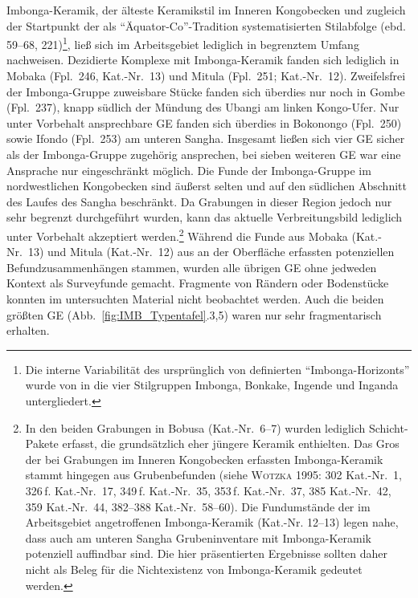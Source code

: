 Imbonga-Keramik, der älteste Keramikstil im Inneren Kongobecken und zugleich der Startpunkt der als \enquote{Äquator-Co}-Tradition systematisierten Stilabfolge (ebd. 59--68, 221)\footnote{Die interne Variabilität des ursprünglich von \textcite{Eggert.1983} definierten \enquote{Imbonga-Horizonts} wurde von \textcite{Wotzka.1995} in die vier Stilgruppen Imbonga, Bonkake, Ingende und Inganda untergliedert.\label{ftn:AufteilungIMB}}, ließ sich im Arbeitsgebiet lediglich in begrenztem Umfang nachweisen. Dezidierte Komplexe mit Imbonga-Keramik fanden sich lediglich in Mobaka (Fpl.~246, Kat.-Nr.~13) und Mitula (Fpl.~251; Kat.-Nr.~12). Zweifelsfrei der Imbonga-Gruppe zuweisbare Stücke fanden sich überdies nur noch in Gombe (Fpl.~237), knapp südlich der Mündung des \mbox{Ubangi} am linken Kongo-Ufer. Nur unter Vorbehalt ansprechbare GE fanden sich überdies in Bokonongo (Fpl.~250) sowie Ifondo (Fpl.~253) am unteren \mbox{Sangha}. Insgesamt ließen sich vier GE sicher als der Imbonga-Gruppe zugehörig ansprechen, bei sieben weiteren GE war eine Ansprache nur eingeschränkt möglich. Die Funde der Imbonga-Gruppe im nordwestlichen Kongobecken sind äußerst selten und auf den südlichen Abschnitt des Laufes des \mbox{Sangha} beschränkt. Da Grabungen in dieser Region jedoch nur sehr begrenzt durchgeführt wurden, kann das aktuelle Verbreitungsbild lediglich unter Vorbehalt akzeptiert werden.\footnote{In den beiden Grabungen in Bobusa (Kat.-Nr.~6--7) wurden lediglich Schicht-Pakete erfasst, die grundsätzlich eher jüngere Keramik enthielten. Das Gros der bei Grabungen im Inneren Kongobecken erfassten Imbonga-Keramik stammt hingegen aus Grubenbefunden (siehe \textsc{Wotzka} 1995: 302 Kat.-Nr.~1, 326\,f. Kat.-Nr.~17, 349\,f. Kat.-Nr.~35, 353\,f. Kat.-Nr.~37, 385 Kat.-Nr.~42, 359 Kat.-Nr.~44, 382--388 Kat.-Nr.~58--60). Die Fundumstände der im Arbeitsgebiet angetroffenen Imbonga-Keramik (Kat.-Nr. 12--13) legen nahe, dass auch am unteren \mbox{Sangha} Grubeninventare mit Imbonga-Keramik potenziell auffindbar sind. Die hier präsentierten Ergebnisse sollten daher nicht als Beleg für die Nichtexistenz von Imbonga-Keramik gedeutet werden.} Während die Funde aus Mobaka (Kat.-Nr.~13) und Mitula (Kat.-Nr.~12) aus an der Oberfläche erfassten potenziellen Befundzusammenhängen stammen, wurden alle übrigen GE ohne jedweden Kontext als Surveyfunde gemacht. Fragmente von Rändern oder Bodenstücke konnten im untersuchten Material nicht beobachtet werden. Auch die beiden größten GE (Abb.~\ref{fig:IMB_Typentafel}.3,5) waren nur sehr fragmentarisch erhalten.

